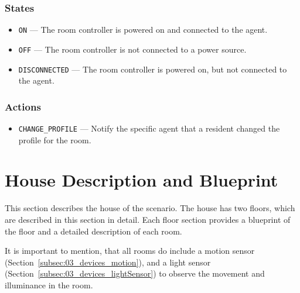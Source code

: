 \documentclass[letterpaper, 11pt]{Proposal}
\def\Sec#1{Section~\ref{#1}}
\begin{document}
\subsubsection{States}
\begin{itemize}
    \item \texttt{ON} --- The room controller is powered on and connected to the agent.
    \item \texttt{OFF} --- The room controller is not connected to a power source.
    \item \texttt{DISCONNECTED} --- The room controller is powered on, but not connected to the agent.
\end{itemize}

\subsubsection{Actions}
\begin{itemize}
    \item \texttt{CHANGE\_PROFILE} --- Notify the specific agent that a resident changed the profile for the room.
\end{itemize}

\section{House Description and Blueprint}\label{sec:04_houseDesc}
This section describes the house of the scenario.
The house has two floors, which are described in this section in detail.
Each floor section provides a blueprint of the floor and a detailed
description of each room.

It is important to mention, that all rooms do include a motion sensor 
(\Sec{subsec:03_devices_motion}), and a light sensor (\Sec{subsec:03_devices_lightSensor}) 
to observe the movement and illuminance in the room.
\end{document}
